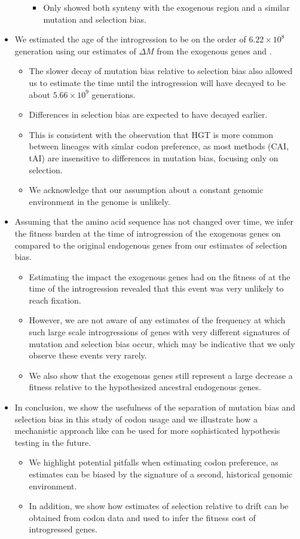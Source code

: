 \documentclass[12pt]{article}
\begin{document}
\begin{itemize}
\begin{itemize}
\begin{itemize}
			\item Only \gossypii showed both synteny with the exogenous region and a similar mutation and selection bias.
		\end{itemize}
	\end{itemize}
	\item We estimated the age of the introgression to be on the order of  $6.22\times10^8$ generation using our estimates of $\Delta M$ from the exogenous genes and \gossypii.
	\begin{itemize}
		\item The slower decay of mutation bias relative to selection bias also allowed us to estimate the time until the introgression will have decayed to be about $5.66\times10^9$ generations.
		\item Differences in selection bias are expected to have decayed earlier.
		\item This is consistent with the observation that HGT is more common between lineages with simlar codon preference, as most methods (CAI, tAI) are insensitive to differences in mutation bias, focusing only on selection.
		\item We acknowledge that our assumption about a constant genomic environment in the \gossypii genome is unlikely.
	\end{itemize}
	\item Assuming that the amino acid sequence has not changed over time, we infer the fitness burden at the time of introgression of the exogenous genes on \kluyveri compared to the original endogenous genes from our estimates of selection bias.
	\begin{itemize}
		\item Estimating the impact the exogenous genes had on the fitness of \kluyveri at the time of the introgression revealed that this event was very unlikely to reach fixation.
		\item However, we are not aware of any estimates of the frequency at which such large scale introgressions of genes with very different signatures of mutation and selection bias occur, which may be indicative that we only observe these events very rarely.
		\item We also show that the exogenous genes still represent a large decrease a fitness relative to the hypothesized ancestral endogenous genes.
	\end{itemize}	
	\item In conclusion, we show the usefulness of the separation of mutation bias and selection bias in this study of codon usage and we illustrate how a mechanistic approach like \ROC can be used for more sophisticated hypothesis testing in the future.
	\begin{itemize}
		\item We highlight potential pitfalls when estimating codon preference, as estimates can be biased by the signature of a second, historical genomic environment.
		\item In addition, we show how estimates of selection relative to drift can be obtained from codon data and used to infer the fitness cost of introgressed genes.
	\end{itemize}
\end{itemize}
\end{document}
